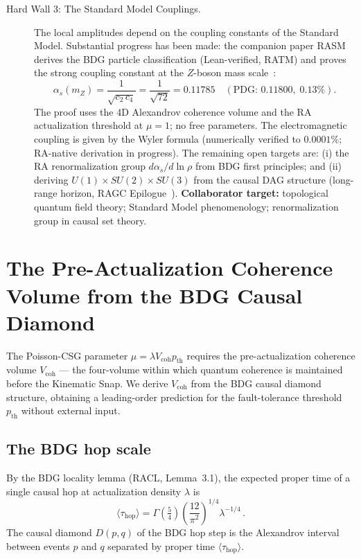 \documentclass[11pt,a4paper]{article}
\theoremstyle{plain}
\theoremstyle{definition}
\theoremstyle{remark}
\begin{document}
\begin{description}
  \item[Hard Wall 3: The Standard Model Couplings.]
  The local amplitudes depend on the coupling constants of the Standard Model.
  Substantial progress has been made: the companion paper
  RASM~\citep{Sandeman2026RASM} derives the BDG particle classification
  (Lean-verified, RATM) and proves the strong coupling constant at the
  $Z$-boson mass scale~\citep{Sandeman2026BDG}:
  \begin{equation}
    \alpha_s(m_Z) = \frac{1}{\sqrt{c_2\,c_4}} = \frac{1}{\sqrt{72}} = 0.11785
    \quad (\text{PDG: } 0.11800,\; 0.13\%).
  \end{equation}
  The proof uses the 4D Alexandrov coherence volume and the RA actualization
  threshold at $\mu=1$; no free parameters.  The electromagnetic coupling
  is given by the Wyler formula (numerically verified to $0.0001\%$;
  RA-native derivation in progress).  The remaining open targets are: (i)
  the RA renormalization group $d\alpha_s/d\!\ln\rho$ from BDG first
  principles; and (ii) deriving $U(1)\times SU(2)\times SU(3)$ from the
  causal DAG structure (long-range horizon, RAGC Epilogue~\citep{Sandeman2026b}).
  \textbf{Collaborator target:} topological quantum field theory; Standard
  Model phenomenology; renormalization group in causal set theory.
\end{description}



\section{The Pre-Actualization Coherence Volume from the BDG Causal Diamond}
\label{sec:vcoh}

The Poisson-CSG parameter $\mu = \lambda V_{\mathrm{coh}} p_{\mathrm{th}}$ requires
the pre-actualization coherence volume $V_{\mathrm{coh}}$ — the four-volume
within which quantum coherence is maintained before the Kinematic Snap.
We derive $V_{\mathrm{coh}}$ from the BDG causal diamond structure,
obtaining a leading-order prediction for the fault-tolerance threshold
$p_{\mathrm{th}}$ without external input.

\subsection{The BDG hop scale}

By the BDG locality lemma (RACL, Lemma~3.1), the expected proper time of
a single causal hop at actualization density $\lambda$ is
\begin{equation}
  \langle\tau_{\mathrm{hop}}\rangle
    = \Gamma\!\left(\tfrac{5}{4}\right)
      \left(\frac{12}{\pi^2}\right)^{\!1/4}
      \lambda^{-1/4} \,.
  \label{eq:tau_hop}
\end{equation}
The causal diamond $D(p,q)$ of the BDG hop step is the Alexandrov interval
between events $p$ and $q$ separated by proper time $\langle\tau_{\mathrm{hop}}\rangle$.
\end{document}
